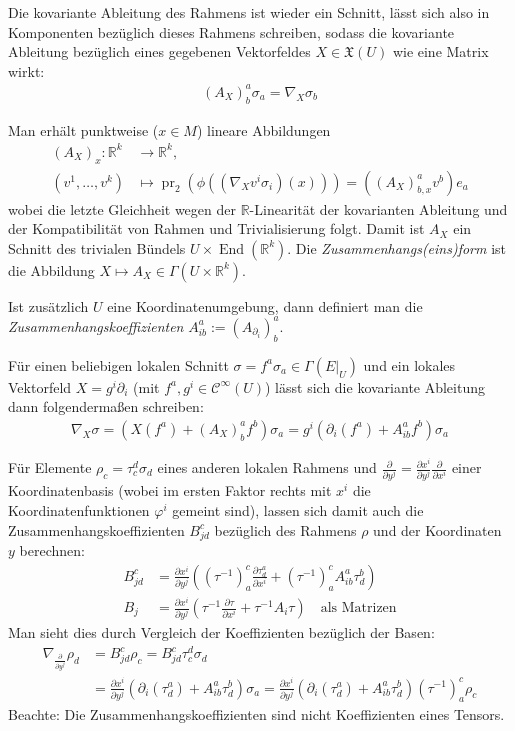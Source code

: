 \documentclass[a4paper]{scrbook}
\numberwithin{equation}{chapter}
\DeclareMathOperator{\End}{End}
\DeclareMathOperator{\pr}{pr}
\newcommand{\R}{\mathbb{R}}
\newcommand{\sC}{\mathcal{C}^{\infty}}
\newcommand{\vf}{\mathfrak{X}}
\theoremstyle{definition}
\begin{document}
		Die kovariante Ableitung des Rahmens ist wieder ein Schnitt, lässt sich also in Komponenten bezüglich dieses Rahmens schreiben, sodass die kovariante Ableitung bezüglich eines gegebenen Vektorfeldes $X\in\vf(U)$ wie eine Matrix wirkt:
		\begin{align*}
			(A_X)^a_b\sigma_a=\nabla_X\sigma_b
		\end{align*}
		
		Man erhält punktweise ($x\in M$) lineare Abbildungen
		\begin{align*}
			(A_X)_x\colon\R^k&\rightarrow\R^k,\\
			(v^1,\ldots,v^k)&\mapsto \pr_2(\phi((\nabla_X v^i\sigma_i)(x)))=((A_X)_{b,x}^av^b)e_a
		\end{align*}
		wobei die letzte Gleichheit wegen der $\R$-Linearität der kovarianten Ableitung und der Kompatibilität von Rahmen und Trivialisierung folgt. Damit ist $A_X$ ein Schnitt des trivialen Bündels $U\times \End(\R^k)$. Die \emph{Zusammenhangs(eins)form} ist die Abbildung $X\mapsto A_X\in\Gamma(U\times \R^k)$.
		
		Ist zusätzlich $U$ eine Koordinatenumgebung, dann definiert man die \emph{Zusammenhangskoeffizienten} $A_{ib}^a:=(A_{\partial_i})^a_b$.
		
		Für einen beliebigen lokalen Schnitt $\sigma=f^a\sigma_a\in\Gamma(E\vert_U)$ und ein lokales Vektorfeld $X=g^i\partial_i$ (mit $f^a,g^i\in\sC(U)$) lässt sich die kovariante Ableitung dann folgendermaßen schreiben:
		\begin{align*}
			\nabla_X\sigma=\left( X(f^a)+(A_X)^a_bf^b\right)\sigma_a=g^i\left( \partial_i(f^a)+A^a_{ib}f^b\right)\sigma_a
		\end{align*}
		
		Für Elemente $\rho_c=\tau_c^d\sigma_d$ eines anderen lokalen Rahmens und $\frac{\partial}{\partial y^j}=\frac{\partial x^i}{\partial y^j}\frac{\partial}{\partial x^i}$ einer Koordinatenbasis (wobei im ersten Faktor rechts mit $x^i$ die Koordinatenfunktionen $\varphi^i$ gemeint sind), lassen sich damit auch die Zusammenhangskoeffizienten $B^c_{jd}$ bezüglich des Rahmens $\rho$ und der Koordinaten $y$ berechnen:
		\begin{align*}
			B^c_{jd}&=\frac{\partial x^i}{\partial y^j}\left((\tau^{-1})^c_a\frac{\partial \tau^a_d}{\partial x^i}+(\tau^{-1})^c_aA^a_{ib}\tau^b_d\right)\\
			B_j&= \frac{\partial x^i}{\partial y^j}\left(\tau^{-1}\frac{\partial \tau}{\partial x^i}+\tau^{-1}A_{i}\tau\right)\quad\text{als Matrizen}
		\end{align*}
		Man sieht dies durch Vergleich der Koeffizienten bezüglich der Basen:
		\begin{align*}
			\nabla_{\frac{\partial}{\partial y^j}}\rho_d&=B_{jd}^c\rho_c=B_{jd}^c\tau_c^d\sigma_d\\
			&=\frac{\partial x^i}{\partial y^j} \left(\partial_i(\tau^a_d)+A^a_{ib}\tau^b_d\right)\sigma_a=\frac{\partial x^i}{\partial y^j} \left(\partial_i(\tau^a_d)+A^a_{ib}\tau^b_d\right)(\tau^{-1})^c_a\rho_c
		\end{align*}
		Beachte: Die Zusammenhangskoeffizienten sind nicht Koeffizienten eines Tensors.
		
\end{document}
